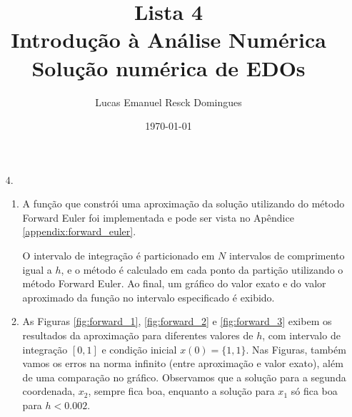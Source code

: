 \documentclass{article}
\title{Lista 4 \\
\large Introdução à Análise Numérica \\
Solução numérica de EDOs}
\author{Lucas Emanuel Resck Domingues}
\date{\today}
\begin{document}
    \maketitle

    \begin{enumerate}
        \item[4.]
            \begin{enumerate}
                \item A função que constrói uma aproximação
                    da solução utilizando do método Forward
                    Euler foi implementada e pode ser vista
                    no Apêndice \ref{appendix:forward_euler}.

                    O intervalo de integração é particionado
                    em $N$ intervalos de comprimento igual a $h$,
                    e o método é calculado em cada ponto da partição
                    utilizando o método Forward Euler. Ao final,
                    um gráfico do valor exato e do valor aproximado
                    da função no intervalo especificado é exibido.

                \item As Figuras \ref{fig:forward_1},
                    \ref{fig:forward_2} e \ref{fig:forward_3}
                    exibem os resultados da aproximação para diferentes
                    valores de $h$, com intervalo de integração $[0, 1]$
                    e condição inicial $x(0) = \{1, 1\}$. Nas Figuras,
                    também vamos os erros na norma infinito (entre
                    aproximação e valor exato), além de uma comparação
                    no gráfico. Observamos que a solução para a segunda
                    coordenada, $x_2$, sempre fica boa, enquanto a solução
                    para $x_1$ só fica boa para $h < 0.002$.
                

\end{enumerate}
\end{enumerate}
\end{document}
